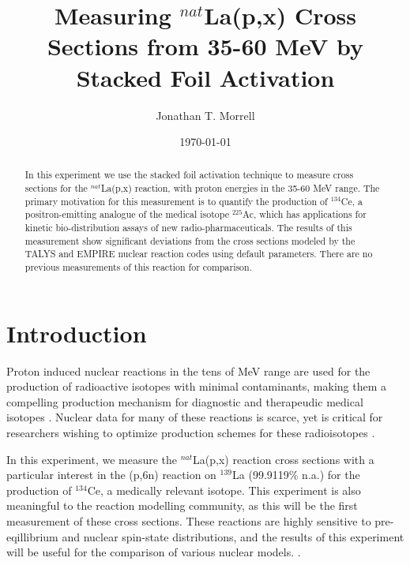 \documentclass[aps,twocolumn,secnumarabic,balancelastpage,amsmath,amssymb,nofootinbib,floatfix]{revtex4-1}
\begin{document}
\title{Measuring $^{nat}$La(p,x) Cross Sections from 35-60 MeV by Stacked Foil Activation}
\author{Jonathan T. Morrell}
\date{\today}
\setlength{\parskip}{1em}

\begin{abstract}
In this experiment we use the stacked foil activation technique to measure cross sections for the $^{nat}$La(p,x) reaction, with proton energies in the 35-60 MeV range.  The primary motivation for this measurement is to quantify the production of $^{134}$Ce, a positron-emitting analogue of the medical isotope $^{225}$Ac, which has applications for kinetic bio-distribution assays of new radio-pharmaceuticals.  The results of this measurement show significant deviations from the cross sections modeled by the TALYS and EMPIRE nuclear reaction codes using default parameters.  There are no previous measurements of this reaction for comparison.
\end{abstract}

\maketitle


\section{Introduction}
Proton induced nuclear reactions in the tens of MeV range are used for the production of radioactive isotopes with minimal contaminants, making them a compelling production mechanism for diagnostic and therapeudic medical isotopes \cite{TARKANYI2016262}.  Nuclear data for many of these reactions is scarce, yet is critical for researchers wishing to optimize production schemes for these radioisotopes \cite{nuclear_data_needs}.

In this experiment, we measure the $^{nat}$La(p,x) reaction cross sections with a particular interest in the (p,6n) reaction on $^{139}$La (99.9119\% n.a.) for the production of $^{134}$Ce, a medically relevant isotope.  This experiment is also meaningful to the reaction modelling community, as this will be the first measurement of these cross sections.  These reactions are highly sensitive to pre-eqillibrium and nuclear spin-state distributions, and the results of this experiment will be useful for the comparison of various nuclear models. \cite{OTUKA2014272, PhysRev.87.366, nuclear_data_needs}.
\end{document}
